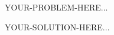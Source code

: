 \documentclass[10pt]{article}
\begin{document}
\thispagestyle{firstpage}
\maketitlepage

\begin{hwproblem}

\leavevmode
\vspace{0.25em}

YOUR-PROBLEM-HERE...

\end{hwproblem}

YOUR-SOLUTION-HERE...

\appendix
\end{document}

